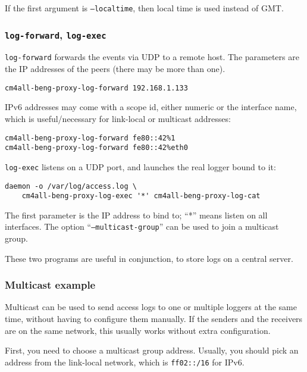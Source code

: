 \documentclass[a4paper,12pt]{article}
\begin{document}
If the first argument is \texttt{--localtime}, then local time is used
instead of GMT.

\subsubsection{\texttt{log-forward}, \texttt{log-exec}}

\texttt{log-forward} forwards the events via UDP to a remote host.
The parameters are the IP addresses of the peers (there may be more
than one).

\begin{verbatim}
cm4all-beng-proxy-log-forward 192.168.1.133
\end{verbatim}

IPv6 addresses may come with a scope id, either numeric or the
interface name, which is useful/necessary for link-local or multicast
addresses:

\begin{verbatim}
cm4all-beng-proxy-log-forward fe80::42%1
cm4all-beng-proxy-log-forward fe80::42%eth0
\end{verbatim}

\texttt{log-exec} listens on a UDP port, and launches the real logger
bound to it:

\begin{verbatim}
daemon -o /var/log/access.log \
    cm4all-beng-proxy-log-exec '*' cm4all-beng-proxy-log-cat
\end{verbatim}

The first parameter is the IP address to bind to; ``*'' means listen
on all interfaces.  The option ``\texttt{--multicast-group}'' can be
used to join a multicast group.

These two programs are useful in conjunction, to store logs on a
central server.

\subsubsection{Multicast example}

Multicast can be used to send access logs to one or multiple loggers
at the same time, without having to configure them manually.  If the
senders and the receivers are on the same network, this usually works
without extra configuration.

First, you need to choose a multicast group address.  Usually, you
should pick an address from the link-local network, which is
\texttt{ff02::/16} for IPv6.
\end{document}
